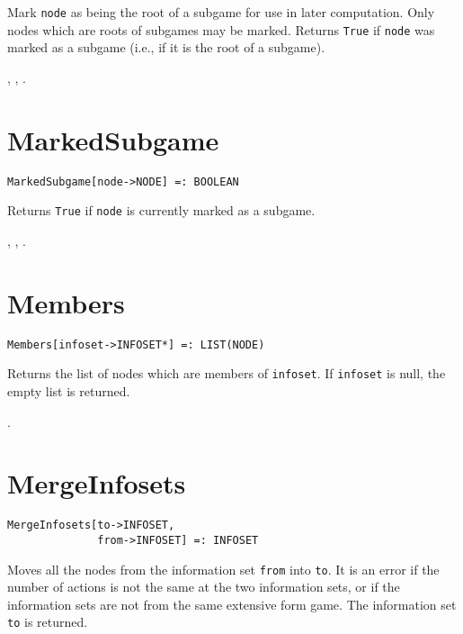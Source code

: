 \noindent
Mark \verb+node+ as being the root of a subgame for use in later computation.
Only nodes which are roots of subgames may be marked.  Returns \verb+True+
if \verb+node+ was marked as a subgame (i.e., if it is the root of a subgame).

\seealso {},
,
.


\section*{MarkedSubgame}\label{PrimMarkedSubgame}
\begin{verbatim}
MarkedSubgame[node->NODE] =: BOOLEAN 
\end{verbatim}

\noindent
Returns \verb+True+ if \verb+node+ is currently marked as a subgame. 

\seealso {},
,
.


\section*{Members}\label{PrimMembers}
\begin{verbatim}
Members[infoset->INFOSET*] =: LIST(NODE) 
\end{verbatim}

\noindent
Returns the list of nodes which are members of \verb+infoset+.  If
\verb+infoset+ is null, the empty list is returned.

\seealso {}.


\section*{MergeInfosets}\label{PrimMergeInfosets}
\begin{verbatim}
MergeInfosets[to->INFOSET,
              from->INFOSET] =: INFOSET
\end{verbatim}

\noindent
Moves all the nodes from the information set \verb+from+ into \verb+to+.
It is an error if the number of actions is not the same at the
two information sets, or if the information sets are not from the
same extensive form game.  The information set \verb+to+ is returned.

